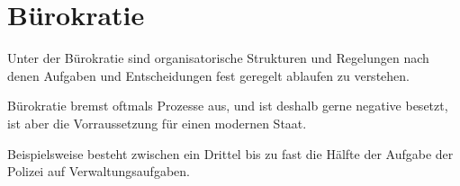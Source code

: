 \documentclass{article}
\begin{document}
\section{Bürokratie} 
Unter der Bürokratie sind organisatorische Strukturen und Regelungen nach denen Aufgaben und Entscheidungen fest geregelt ablaufen zu verstehen.

Bürokratie bremst oftmals Prozesse aus, und ist deshalb gerne negative besetzt, ist aber die Vorraussetzung für einen modernen Staat.

Beispielsweise besteht zwischen ein Drittel bis zu fast die Hälfte der Aufgabe der Polizei auf Verwaltungsaufgaben.
\end{document}
